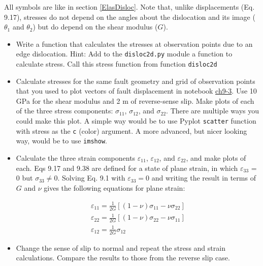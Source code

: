 \documentclass[a4paper , 12pt]{book}
\newcommand{\code}[1]{\colorbox{light-gray}{\texttt{#1}}}
\begin{document}
\begin{enumerate}
    All symbols are like in section \ref{ElasDisloc}. Note that, unlike displacements (Eq. 9.17), stresses do not depend on the angles about the dislocation and its image ($\theta_1$ and $\theta_2$) but do depend on the shear modulus ($G$).
    \begin{itemize}
        \item Write a function that calculates the stresses at observation points due to an edge dislocation. Hint: Add to the \code{disloc2d.py} module a function to calculate stress. Call this stress function from function \code{disloc2d}
        \item Calculate stresses for the same fault geometry and grid of observation points that you used to plot vectors of fault displacement in notebook \href{https://github.com/nfcd/compGeo/blob/master/source/notebooks/ch9-3.ipynb}{ch9-3}. Use 10 GPa for the shear modulus and 2 m of reverse-sense slip. Make plots of each of the three stress components: $\sigma_{11}$, $\sigma_{12}$, and $\sigma_{22}$. There are multiple ways you could make this plot. A simple way would be to use Pyplot \code{scatter} function with stress as the \code{c} (color) argument. A more advanced, but nicer looking way, would be to use \code{imshow}.
        \item Calculate the three strain components $\varepsilon_{11}$, $\varepsilon_{12}$, and $\varepsilon_{22}$, and make plots of each. Eqs 9.17 and 9.38 are defined for a state of plane strain, in which $\varepsilon_{33}$ = 0 but $\sigma_{33} \neq 0$. Solving Eq. 9.1 with $\varepsilon_{33} = 0$ and writing the result in terms of $G$ and $\nu$ gives the following equations for plane strain:
        
        \begin{equation}
        \begin{gathered}
            \varepsilon_{11}=\frac{1}{2 G}\left[(1-\nu) \sigma_{11}-\nu \sigma_{22}\right] \\ 
            \varepsilon_{22}=\frac{1}{2 G}\left[(1-\nu) \sigma_{22}-\nu \sigma_{11}\right] \\
            \varepsilon_{12}=\frac{1}{2 G} \sigma_{12}
        \end{gathered}
        \end{equation}
        
        \item Change the sense of slip to normal and repeat the stress and strain calculations. Compare the results to those from the reverse slip case.
        

\end{itemize}
\end{enumerate}
\end{document}
